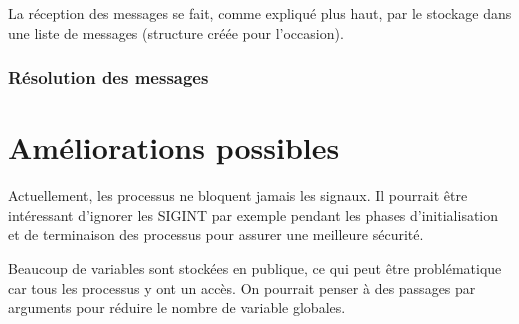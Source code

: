 \documentclass[a4paper,12pt]{article}
\begin{document}
La réception des messages se fait, comme expliqué plus haut, par le stockage dans une liste de messages (structure créée pour l'occasion).

\subsubsection{Résolution des messages}


\section{Améliorations possibles}

Actuellement, les processus ne bloquent jamais les signaux. Il pourrait être intéressant d'ignorer les SIGINT par exemple pendant les phases d'initialisation et de terminaison des processus pour assurer une meilleure sécurité.

Beaucoup de variables sont stockées en publique, ce qui peut être problématique car tous les processus y ont un accès. On pourrait penser à des passages par arguments pour réduire le nombre de variable globales.
\end{document}
